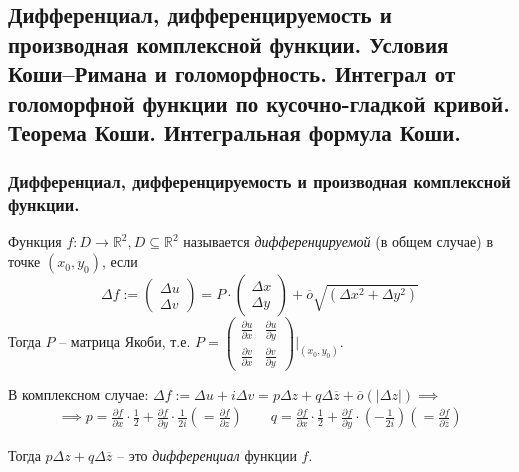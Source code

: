\subsection{Дифференциал, дифференцируемость и производная комплексной функции. Условия Коши--Римана и голоморфность. Интеграл от голоморфной функции по кусочно-гладкой кривой. Теорема Коши. Интегральная формула Коши.}

\subsubsection{Дифференциал, дифференцируемость и производная комплексной функции.}

\begin{definition*}
	Функция $f: D \to \mathbb{R}^2, D \subseteq  \mathbb{R}^2$  называется \textit{дифференцируемой} (в общем случае) в точке $(x_0, y_0)$, если 
	$$
	\Delta f:= \begin{pmatrix}
	\Delta u \\ \Delta v
	\end{pmatrix} = P \cdot \begin{pmatrix}
	\Delta x \\ \Delta y
	\end{pmatrix}
	 + \overline{o}\sqrt{(\Delta x^2 + \Delta y^2)}
	 $$  
	 Тогда $P$ -- матрица Якоби, т.е. $P = \begin{pmatrix}
	 \frac{\partial u}{\partial x} & \frac{\partial u}{\partial y} \\
	 \frac{\partial v}{\partial x} & \frac{\partial v}{\partial y}
	 \end{pmatrix}\Biggl|_{(x_0, y_0)}$.
	
\end{definition*}

 В комплексном случае: $
\Delta f := \Delta u + i \Delta v = p \Delta z + q \Delta \overline{z} + \overline{o}(|\Delta z|) \implies $ 
\begin{align*}
\implies  p = \frac{\partial f}{\partial x} \cdot \frac 12 + \frac{\partial f}{\partial y} \cdot \frac{1}{2i} \left(= \frac{\partial f}{\partial z}\right) \qquad  
q = \frac{\partial f}{\partial x} \cdot \frac 12 + \frac{\partial f}{\partial y} \cdot \left( -\frac{1}{2i} \right) \left(= \frac{\partial f}{\partial \overline{z}}\right) 
\end{align*}

\begin{definition*}
	Тогда $p \Delta z + q \Delta \overline{z} $ -- это \textit{дифференциал} функции $f$.	 
\end{definition*}

